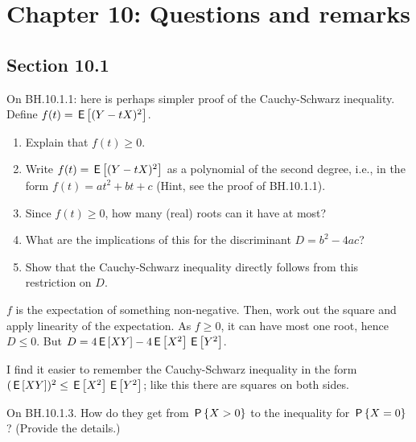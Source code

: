 


\chapter{Chapter 10: Questions and remarks}


\section{Section 10.1}


\begin{exercise}
On BH.10.1.1:  here is perhaps simpler proof of the Cauchy-Schwarz inequality.  Define  $f(t) = \E{(Y-tX)^2}$.
\begin{enumerate}
\item Explain that $f(t)\geq 0$.
\item Write $f(t) = \E{(Y-tX)^2}$ as a polynomial of the second degree, i.e., in the form $f(t) = a t^2 + b t + c$  (Hint, see the proof of BH.10.1.1).
\item Since $f(t) \geq 0$, how many (real) roots can it have at most?
\item What are the implications of this for the discriminant $D=b^2-4ac$?
\item Show that the Cauchy-Schwarz inequality directly follows from this restriction on $D$.
\end{enumerate}
\begin{solution}
$f$ is the expectation of something non-negative. Then, work out the square and apply linearity of the expectation. As $f\geq 0$, it can have most one root, hence $D\leq 0$. But $D=4\E{XY} - 4\E{X^{2}}\E{Y^{2}}$.
\end{solution}
\end{exercise}

\begin{remark}
I find it easier to remember the Cauchy-Schwarz inequality in the form $(\E{XY})^2 \leq \E{X^2}\E{Y^2}$; like this there are squares on both sides.
\end{remark}

\begin{exercise}
On BH.10.1.3. How do they get from $\P{X>0}$ to the inequality for $\P{X=0}$? (Provide the details.)
\begin{hint}
\end{hint}
\begin{solution}
\end{solution}
\end{exercise}

